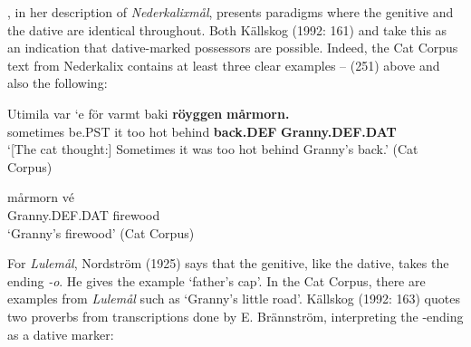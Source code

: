 
\citet{Rutberg1924}, in her description of \textit{Nederkalixmål}, presents paradigms where the genitive and the dative are identical throughout. Both Källskog (1992: 161) and \citet[42]{Delsing2003a} take this as an indication that dative-marked possessors are possible. Indeed, the Cat Corpus text from Nederkalix contains at least three clear examples – (251) above and also the following:


\ea\label{}
\gll Utimila  var  ‘e  för  varmt  baki  \textbf{röyggen} \textbf{mårmorn.}\\
sometimes  be.PST  it  too  hot  behind  \textbf{back.DEF} \textbf{Granny.DEF.DAT}\\
\glt ‘[The cat thought:] Sometimes it was too hot behind Granny’s back.’ (Cat Corpus)
\z

\ea\label{}
\gll mårmorn  vé\\
Granny.DEF.DAT  firewood\\
\glt ‘Granny’s firewood’  (Cat Corpus)
\z

For \textit{Lulemål}, Nordström (1925) says that the genitive, like the dative, takes the ending\textit{ {}-o}. He gives the example  ‘father’s cap’. In the Cat Corpus, there are examples from \textit{Lulemål} such as  ‘Granny’s little road’.  Källskog (1992: 163) quotes two proverbs from transcriptions done by E. Brännström, interpreting the -ending as a dative marker: 


\ea\label{}

\z 
\z

